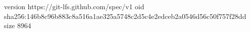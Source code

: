 version https://git-lfs.github.com/spec/v1
oid sha256:146b8c96b883c8a516a1ae325a5748c2d5c4e2edceb2a0546d56c50f757f28dd
size 8964
